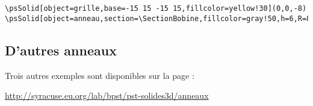 \begin{lstlisting}[basicstyle=\small\ttfamily]
\psSolid[object=grille,base=-15 15 -15 15,fillcolor=yellow!30](0,0,-8)
\psSolid[object=anneau,section=\SectionBobine,fillcolor=gray!50,h=6,R=8,r=4,RotX=90,linecolor=gray]%
\end{lstlisting}


\subsection{D'autres anneaux}
Trois autres exemples sont disponibles sur la page :

\url{http://syracuse.eu.org/lab/bpst/pst-solides3d/anneaux}


\endinput